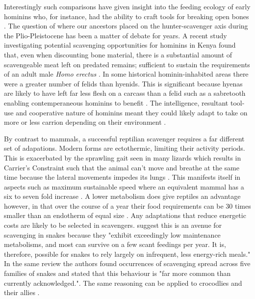 \documentclass[a4paper,12pt]{article}
\begin{document}
Interestingly such comparisons have given insight into the feeding ecology of early hominins who, for instance, had the ability to craft tools for breaking open bones \citep{ARCM:ARCM12084}. The question of where our ancestors placed on the hunter-scavenger axis during the Plio-Pleistocene has been a matter of debate for years. A recent study investigating potential scavenging opportunities for hominins in Kenya found that, even when discounting bone material, there is a substantial amount of scavengeable meat left on predated remains; sufficient to sustain the requirements of an adult male \textit{Homo erectus} \citep{pobiner2015new}. In some historical hominin-inhabited areas there were a greater number of felids than hyenids. This is significant because hyenas are likely to have left far less flesh on a carcass than a felid such as a sabretooth enabling contemperaneous hominins to benefit \citep{pobiner2015new}. 
The intelligence, resultant tool-use and cooperative nature of hominins meant they could likely adapt to take on more or less carrion depending on their environment \citep{moleon2014humans}. 

By contrast to mammals, a successful reptilian scavenger requires a far different set of adapations. Modern forms are ectothermic, limiting their activity periods. This is exacerbated by the sprawling gait seen in many lizards which results in Carrier's Constraint such that the animal can't move and breathe at the same time because the lateral movements impedes its lungs \citep{carrier1987evolution}. This manifests itself in aspects such as maximum sustainable speed where an equivalent mammal has a six to seven fold increase \citep{ruben1995evolution}. A lower metabolism does give reptiles an advantage however, in that over the course of a year their food requirements can be 30 times smaller than an endotherm of equal size \citep{Nagy1621}. Any adaptations that reduce energetic costs are likely to be selected in scavengers. \cite{devault2002scavenging} suggest this is an avenue for scavenging in snakes because they "exhibit  exceedingly  low  maintenance  metabolisms,  and most  can  survive  on  a  few  scant  feedings per year. It  is, therefore, possible for snakes to rely largely  on  infrequent,  less  energy-rich  meals." In the same review the authors found occurrences of scavenging spread across five families of snakes and stated that this behaviour is "far more common than currently acknowledged."\citep{devault2002scavenging}. The same reasoning can be applied to crocodlies and their allies \citep{forrest2003evidence}. 
\end{document}
